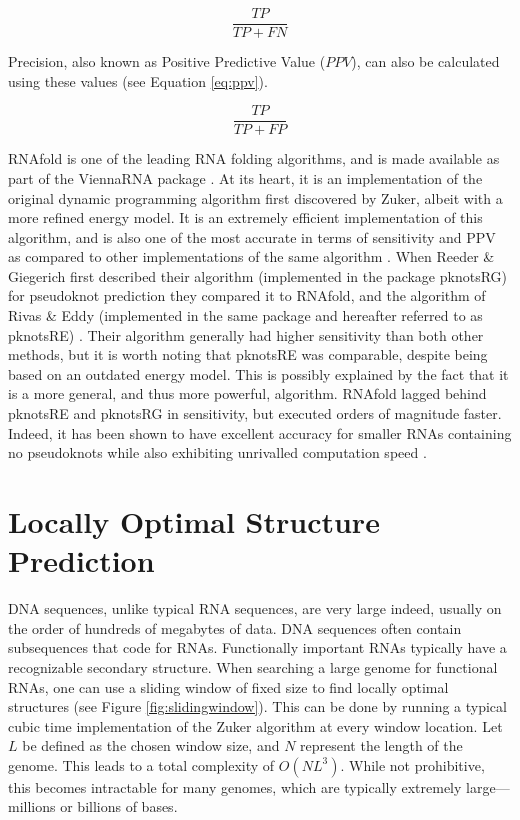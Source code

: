 \documentclass{cshonours}
\begin{document}
\begin{equation} \label{eq:tpr}
 \frac{TP}{TP + FN}
\end{equation}

Precision, also known as Positive Predictive Value ($PPV$), can also be calculated
using these values (see Equation \ref{eq:ppv}).


\begin{equation} \label{eq:ppv}
 \frac{TP}{TP + FP}
\end{equation}


RNAfold \cite{lorenz2011viennarna} is one of the leading RNA folding algorithms, and is made available
as part of the ViennaRNA package \cite{lorenz2011viennarna}. At its heart, it is an implementation
of the original dynamic programming algorithm first discovered by Zuker, albeit
with a more refined energy model. It is an extremely efficient implementation of
this algorithm, and is also one of the most accurate in terms of sensitivity and
PPV as compared to other implementations of the same algorithm \cite{lorenz2011viennarna}. When
Reeder \& Giegerich \cite{reeder2004design} first described their algorithm (implemented in the package pknotsRG) for pseudoknot prediction they compared it to RNAfold, and the
algorithm of Rivas \& Eddy (implemented in the same package and hereafter
referred to as pknotsRE) \cite{rivas1999dynamic}. Their algorithm generally had higher sensitivity than
both other methods, but it is worth noting that pknotsRE was comparable, despite being based on an outdated energy model. This is possibly explained by
the fact that it is a more general, and thus more powerful, algorithm. RNAfold
lagged behind pknotsRE and pknotsRG in sensitivity, but executed orders of magnitude faster. Indeed, it has been shown to have excellent accuracy for smaller RNAs containing
no pseudoknots while also exhibiting unrivalled computation speed \cite{lorenz2011viennarna}.


\section{Locally Optimal Structure Prediction}
\label{sec:locopt}


DNA sequences, unlike typical RNA sequences, are very large indeed, usually
on the order of hundreds of megabytes of data. DNA sequences often contain subsequences that code for RNAs. Functionally important RNAs typically have
a recognizable secondary structure. When searching a large genome for functional RNAs, one can use a sliding window of fixed size to find locally optimal
structures (see Figure \ref{fig:slidingwindow}). This can be done by running a typical cubic time implementation of the Zuker algorithm at every window location. Let $L$ be defined as the chosen
window size, and $N$ represent the length of the genome. This leads to a total complexity of $O(NL^3)$. While not prohibitive, this becomes intractable for many
genomes, which are typically extremely large---millions or billions of bases. 
\end{document}

